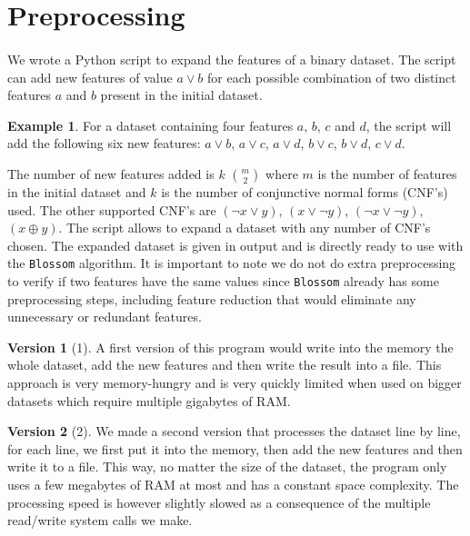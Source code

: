 \documentclass[12pt]{report}
\theoremstyle{definition}
\newtheorem*{example}{Example}
\theoremstyle{definition}
\theoremstyle{definition}
\newtheorem*{version}{Version}
\begin{document}
\newpage
\section{Preprocessing}
\paragraph{} We wrote a Python script to expand the features of a binary dataset. The script can add new features of value $a \lor b$ for each possible combination of two distinct features $a$ and $b$ present in the initial dataset.

\begin{example}
    For a dataset containing four features $a$, $b$, $c$ and $d$, the script will add the following six new features: $a \lor b$, $a \lor c$, $a \lor d$, $b \lor c$, $b \lor d$, $c \lor d$.
\end{example}

The number of new features added is $k$ $m \choose 2$ where $m$ is the number of features in the initial dataset and $k$ is the number of conjunctive normal forms (CNF's) used. The other supported CNF's are $(\neg x \lor y)$, $(x \lor \neg y)$, $(\neg x \lor \neg y)$, $(x \oplus y)$. The script allows to expand a dataset with any number of CNF's chosen. The expanded dataset is given in output and is directly ready to use with the \texttt{Blossom} algorithm. It is important to note we do not do extra preprocessing to verify if two features have the same values since \texttt{Blossom} already has some preprocessing steps, including feature reduction that would eliminate any unnecessary or redundant features.

\begin{version}[1] A first version of this program would write into the memory the whole dataset, add the new features and then write the result into a file. This approach is very memory-hungry and is very quickly limited when used on bigger datasets which require multiple gigabytes of RAM.
\end{version}

\begin{version}[2] We made a second version that processes the dataset line by line, for each line, we first put it into the memory, then add the new features and then write it to a file. This way, no matter the size of the dataset, the program only uses a few megabytes of RAM at most and has a constant space complexity. The processing speed is however slightly slowed as a consequence of the multiple read/write system calls we make.
\end{version}
\end{document}
